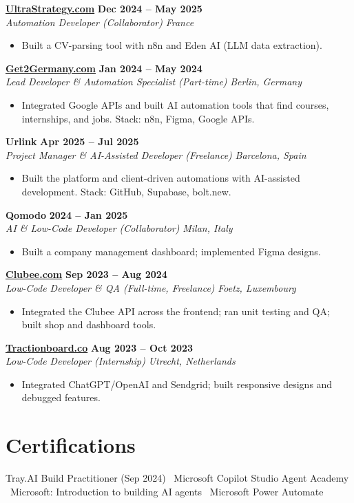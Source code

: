 \documentclass[a4paper,10pt]{article}
\newcommand{\role}[4]{%
 \textbf{#1} \hfill \textbf{#2}\\[1pt]%
 \textit{#3} \hfill \textit{#4}\\[2pt]%
}
\begin{document}
\role{\href{https://ultrastrategy.com}{UltraStrategy.com}}{Dec 2024 -- May 2025}{Automation Developer (Collaborator)}{France}
\begin{itemize}
 \item Built a CV-parsing tool with n8n and Eden AI (LLM data extraction).
\end{itemize}

\role{\href{https://get2germany.com}{Get2Germany.com}}{Jan 2024 -- May 2024}{Lead Developer \& Automation Specialist (Part-time)}{Berlin, Germany}
\begin{itemize}
 \item Integrated Google APIs and built AI automation tools that find courses, internships, and jobs. Stack: n8n, Figma, Google APIs.
\end{itemize}

\role{Urlink}{Apr 2025 -- Jul 2025}{Project Manager \& AI-Assisted Developer (Freelance)}{Barcelona, Spain}
\begin{itemize}
 \item Built the platform and client-driven automations with AI-assisted development. Stack: GitHub, Supabase, bolt.new.
\end{itemize}

\role{Qomodo}{2024 -- Jan 2025}{AI \& Low-Code Developer (Collaborator)}{Milan, Italy}
\begin{itemize}
 \item Built a company management dashboard; implemented Figma designs.
\end{itemize}

\role{\href{https://clubee.com}{Clubee.com}}{Sep 2023 -- Aug 2024}{Low-Code Developer \& QA (Full-time, Freelance)}{Foetz, Luxembourg}
\begin{itemize}
 \item Integrated the Clubee API across the frontend; ran unit testing and QA; built shop and dashboard tools.
\end{itemize}

\role{\href{https://tractionboard.co}{Tractionboard.co}}{Aug 2023 -- Oct 2023}{Low-Code Developer (Internship)}{Utrecht, Netherlands}
\begin{itemize}
 \item Integrated ChatGPT/OpenAI and Sendgrid; built responsive designs and debugged features.
\end{itemize}

\section{Certifications}
Tray.AI Build Practitioner (Sep 2024) \textbullet\ Microsoft Copilot Studio Agent Academy \textbullet\ Microsoft: Introduction to building AI agents \textbullet\ Microsoft Power Automate
\end{document}
